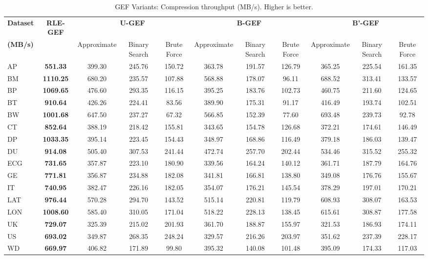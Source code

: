 \begin{table*}[htbp]
\caption{GEF Variants: Compression throughput (MB/s). Higher is better.}
\label{tab:gef_comp_throughput}
\centering
\small
\setlength{\tabcolsep}{4pt} %
\begin{tabular}{lcccccccccc}
\toprule
\textbf{Dataset} & \textbf{RLE-GEF} & \multicolumn{3}{c}{\textbf{U-GEF}} & \multicolumn{3}{c}{\textbf{B-GEF}} & \multicolumn{3}{c}{\textbf{B'-GEF}} \\
\textbf{(MB/s)} &   & Approximate & Binary Search & Brute Force & Approximate & Binary Search & Brute Force & Approximate & Binary Search & Brute Force \\
\cmidrule(lr){3-5} \cmidrule(lr){6-8} \cmidrule(lr){9-11} 
\midrule
AP & \textbf{551.33} & 399.30 & 245.76 & 150.72 & 363.78 & 191.57 & 126.79 & 365.25 & 225.54 & 161.35 \\
BM & \textbf{1110.25} & 680.20 & 235.57 & 107.88 & 568.88 & 178.07 & 96.11 & 688.52 & 313.41 & 133.57 \\
BP & \textbf{1069.65} & 476.60 & 293.35 & 116.15 & 395.25 & 183.76 & 102.73 & 460.75 & 211.60 & 124.65 \\
BT & \textbf{910.64} & 426.26 & 224.41 & 83.56 & 389.90 & 175.31 & 91.17 & 416.49 & 193.74 & 102.51 \\
BW & \textbf{1001.68} & 647.50 & 237.27 & 67.32 & 566.85 & 152.39 & 77.60 & 693.48 & 239.73 & 92.78 \\
CT & \textbf{852.64} & 388.19 & 218.42 & 155.81 & 343.65 & 154.78 & 126.68 & 372.21 & 174.61 & 146.49 \\
DP & \textbf{1033.35} & 395.14 & 223.45 & 154.43 & 348.97 & 168.86 & 116.49 & 379.18 & 186.03 & 139.47 \\
DU & \textbf{914.08} & 505.40 & 307.53 & 241.44 & 472.74 & 257.70 & 202.44 & 534.46 & 315.52 & 255.32 \\
ECG & \textbf{731.65} & 357.87 & 223.10 & 180.90 & 339.56 & 164.24 & 140.12 & 361.71 & 187.79 & 164.76 \\
GE & \textbf{771.81} & 356.87 & 234.88 & 182.08 & 341.81 & 166.81 & 138.80 & 349.08 & 176.76 & 155.67 \\
IT & \textbf{740.95} & 382.47 & 226.16 & 182.05 & 354.07 & 176.21 & 145.54 & 378.29 & 197.01 & 170.21 \\
LAT & \textbf{976.44} & 570.28 & 294.70 & 143.52 & 515.14 & 220.81 & 119.79 & 608.93 & 308.07 & 163.53 \\
LON & \textbf{1008.60} & 585.40 & 310.05 & 171.04 & 518.22 & 228.13 & 138.45 & 615.61 & 308.87 & 177.58 \\
UK & \textbf{729.07} & 325.39 & 215.02 & 201.93 & 361.70 & 188.87 & 155.97 & 321.53 & 186.93 & 174.11 \\
US & \textbf{693.02} & 349.87 & 268.35 & 248.24 & 329.57 & 216.26 & 203.97 & 351.62 & 237.39 & 228.17 \\
WD & \textbf{669.97} & 406.82 & 171.89 & 99.80 & 395.32 & 140.08 & 101.48 & 395.09 & 174.33 & 117.03 \\
\bottomrule
\end{tabular}
\end{table*}
